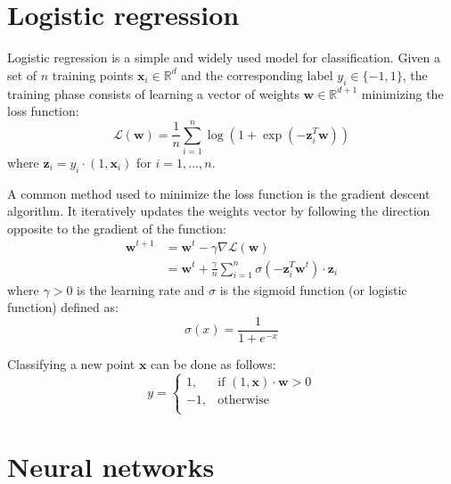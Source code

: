 \documentclass[a4paper,11pt,oneside]{report}
\begin{document}

\section{Logistic regression}

Logistic regression is a simple and widely used model for classification. 
Given a set of $n$ training points $\mathbf{x}_i \in \mathbb{R}^d$ and the corresponding label $y_i \in \{-1,1\}$, the training phase consists of learning a vector of weights $\mathbf{w} \in \mathbb{R}^{d+1}$ minimizing the loss function:
\begin{equation}\label{eq:logistic_reg_train}
    \mathcal{L}(\mathbf{w}) = \frac{1}{n} \sum_{i=1}^{n} \log(1 + \exp(-\mathbf{z}_i^T \mathbf{w})) 
\end{equation}
where $\mathbf{z}_i = y_i \cdot (1, \mathbf{x}_i)$ for $i=1,...,n$.

A common method used to minimize the loss function is the gradient descent algorithm. 
It iteratively updates the weights vector by following the direction opposite to the gradient of the function:
\begin{align}\label{eq:gradient_descent}
    \mathbf{w}^{t+1} & = \mathbf{w}^t - \gamma\nabla\mathcal{L}(\mathbf{w}) \nonumber \\ 
    & = \mathbf{w}^t + \frac{\gamma}{n} \sum_{i=1}^{n} \sigma(-\mathbf{z}_i^T \mathbf{w}^t) \cdot \mathbf{z}_i
\end{align}
where $\gamma > 0$ is the learning rate and $\sigma$ is the sigmoid function (or logistic function) defined as:
\begin{equation}\label{eq:sigmoid}
    \sigma(x) = \frac{1}{1 + e^{-x}}
\end{equation}

Classifying a new point $\mathbf{x}$ can be done as follows:
\begin{equation}\label{eq:logistic_reg_pred}
    y = 
    \begin{cases}
        1, & \text{if } (1, \mathbf{x}) \cdot \mathbf{w} > 0 \\
        -1, & \text{otherwise} \\
    \end{cases}
\end{equation}

\section{Neural networks}
\end{document}
